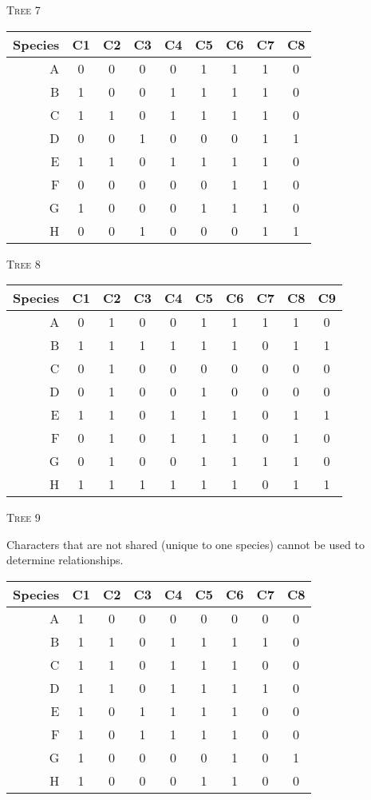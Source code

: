\documentclass[12pt]{article}
\begin{document}
\quad

\textsc{Tree 7}

\begin{longtable}[l]{@{}rcccccccc@{}}
\toprule
Species	& C1	& C2	& C3	& C4	& C5	& C6	& C7 & C8 \tabularnewline
\midrule
A 		& 0 	& 0 	& 0 	& 0		& 1 	& 1 	& 1  & 0  \tabularnewline
B 		& 1 	& 0 	& 0 	& 1 	& 1 	& 1 	& 1  & 0  \tabularnewline
C 		& 1 	& 1 	& 0 	& 1 	& 1 	& 1 	& 1  & 0  \tabularnewline
D 		& 0 	& 0 	& 1 	& 0 	& 0 	& 0 	& 1  & 1  \tabularnewline
E 		& 1 	& 1 	& 0 	& 1 	& 1 	& 1 	& 1  & 0  \tabularnewline
F 		& 0 	& 0 	& 0 	& 0 	& 0 	& 1 	& 1  & 0  \tabularnewline
G 		& 1 	& 0 	& 0 	& 0 	& 1 	& 1 	& 1  & 0  \tabularnewline
H 		& 0 	& 0 	& 1 	& 0 	& 0 	& 0 	& 1  & 1  \tabularnewline
\bottomrule
\end{longtable}

\quad


\textsc{Tree 8}

\begin{longtable}[l]{@{}rccccccccc@{}}
\toprule
Species	& C1 & C2 & C3 & C4	& C5 & C6 & C7 & C8 & C9 \tabularnewline
\midrule
A 		& 0  & 1  & 0  & 0	& 1  & 1  & 1  & 1  & 0  \tabularnewline
B 		& 1  & 1  & 1  & 1 	& 1  & 1  & 0  & 1  & 1  \tabularnewline
C 		& 0  & 1  & 0  & 0 	& 0  & 0  & 0  & 0  & 0  \tabularnewline
D 		& 0  & 1  & 0  & 0 	& 1  & 0  & 0  & 0  & 0  \tabularnewline
E 		& 1  & 1  & 0  & 1 	& 1  & 1  & 0  & 1  & 1  \tabularnewline
F 		& 0  & 1  & 0  & 1 	& 1  & 1  & 0  & 1  & 0  \tabularnewline
G 		& 0  & 1  & 0  & 0 	& 1  & 1  & 1  & 1  & 0  \tabularnewline
H 		& 1  & 1  & 1  & 1	& 1  & 1  & 0  & 1  & 1  \tabularnewline
\bottomrule
\end{longtable}

\quad

\textsc{Tree 9}

Characters that are not shared (unique to one species) cannot be used to determine relationships.

\begin{longtable}[l]{@{}rcccccccc@{}}
\toprule
Species	& C1 & C2 & C3 & C4	& C5 & C6 & C7 & C8 \tabularnewline
\midrule
A 		& 1  & 0  & 0  & 0	& 0  & 0  & 0  & 0  \tabularnewline
B 		& 1  & 1  & 0  & 1 	& 1  & 1  & 1  & 0  \tabularnewline
C 		& 1  & 1  & 0  & 1 	& 1  & 1  & 0  & 0  \tabularnewline
D 		& 1  & 1  & 0  & 1 	& 1  & 1  & 1  & 0  \tabularnewline
E 		& 1  & 0  & 1  & 1 	& 1  & 1  & 0  & 0  \tabularnewline
F 		& 1  & 0  & 1  & 1 	& 1  & 1  & 0  & 0  \tabularnewline
G 		& 1  & 0  & 0  & 0 	& 0  & 1  & 0  & 1  \tabularnewline
H 		& 1  & 0  & 0  & 0 	& 1  & 1  & 0  & 0  \tabularnewline
\bottomrule
\end{longtable}
\end{document}
